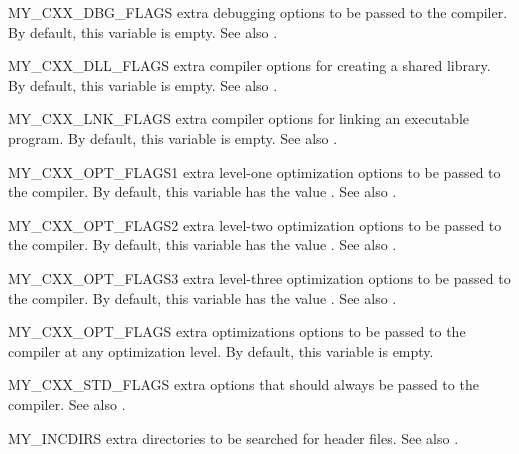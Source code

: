 \documentclass[a4paper,10pt]{article}
\begin{document}
\begin{Description}[\Code]
\item[MY_CXX_DBG_FLAGS] \label{makevar:MY-CXX-DBG-FLAGS} extra
  debugging options to be passed to the compiler. By default, this
  variable is empty. See also
  \hyperref[makevar:CXX-DBG-FLAGS]{}.

\item[MY_CXX_DLL_FLAGS] \label{makevar:MY-CXX-DLL-FLAGS} extra
  compiler options for creating a shared library. By default, this
  variable is empty. See also
  \hyperref[makevar:CXX-DLL-FLAGS]{}.

\item[MY_CXX_LNK_FLAGS] \label{makevar:MY-CXX-LNK-FLAGS} extra
  compiler options for linking an executable program. By default, this
  variable is empty. See also
  \hyperref[makevar:CXX-LNK-FLAGS]{}.

\item[MY_CXX_OPT_FLAGS1] \label{makevar:MY-CXX-OPT-FLAGS1} extra
  level-one optimization options to be passed to the compiler. By
  default, this variable has the value .
  See also \hyperref[makevar:CXX-OPT-FLAGS1]{}.

\item[MY_CXX_OPT_FLAGS2] \label{makevar:MY-CXX-OPT-FLAGS2} extra
  level-two optimization options to be passed to the compiler. By
  default, this variable has the value .
  See also \hyperref[makevar:CXX-OPT-FLAGS2]{}.

\item[MY_CXX_OPT_FLAGS3] \label{makevar:MY-CXX-OPT-FLAGS3} extra
  level-three optimization options to be passed to the compiler. By
  default, this variable has the value .
  See also \hyperref[makevar:CXX-OPT-FLAGS3]{}.

\item[MY_CXX_OPT_FLAGS] \label{makevar:MY-CXX-OPT-FLAGS} extra
  optimizations options to be passed to the compiler at any
  optimization level. By default, this variable is empty.

\item[MY_CXX_STD_FLAGS] \label{makevar:MY-CXX-STD-FLAGS} extra options
  that should always be passed to the compiler. See also
  \hyperref[makevar:CXX-STD-FLAGS]{}.

\item[MY_INCDIRS] \label{makevar:MY-INCDIRS} extra directories to be
  searched for header files. See also
  \hyperref[makevar:INCDIRS]{}.


\end{Description}
\end{document}
